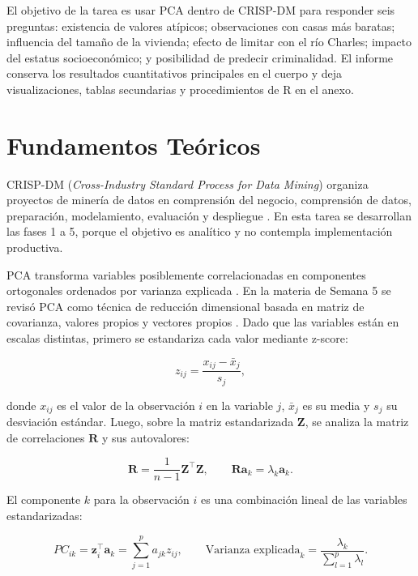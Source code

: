 \documentclass[10pt,a4paper]{article}
\begin{document}
El objetivo de la tarea es usar PCA dentro de CRISP-DM para responder seis preguntas: existencia de valores atípicos; observaciones con casas más baratas; influencia del tamaño de la vivienda; efecto de limitar con el río Charles; impacto del estatus socioeconómico; y posibilidad de predecir criminalidad. El informe conserva los resultados cuantitativos principales en el cuerpo y deja visualizaciones, tablas secundarias y procedimientos de R en el anexo.

\section{Fundamentos Teóricos}

CRISP-DM (\textit{Cross-Industry Standard Process for Data Mining}) organiza proyectos de minería de datos en comprensión del negocio, comprensión de datos, preparación, modelamiento, evaluación y despliegue \citep{chapman2000,levano2026crispdm}. En esta tarea se desarrollan las fases 1 a 5, porque el objetivo es analítico y no contempla implementación productiva.

PCA transforma variables posiblemente correlacionadas en componentes ortogonales ordenados por varianza explicada \citep{jolliffe2002,levano2026pca2}. En la materia de Semana 5 se revisó PCA como técnica de reducción dimensional basada en matriz de covarianza, valores propios y vectores propios \citep{levano2026pca1,levano2026pca2}. Dado que las variables están en escalas distintas, primero se estandariza cada valor mediante z-score:

\begin{equation}
  z_{ij} = \frac{x_{ij} - \bar{x}_j}{s_j},
\end{equation}

donde $x_{ij}$ es el valor de la observación $i$ en la variable $j$, $\bar{x}_j$ es su media y $s_j$ su desviación estándar. Luego, sobre la matriz estandarizada $\mathbf{Z}$, se analiza la matriz de correlaciones $\mathbf{R}$ y sus autovalores:

\begin{equation}
  \mathbf{R}=\frac{1}{n-1}\mathbf{Z}^{\top}\mathbf{Z}, \qquad
  \mathbf{R}\mathbf{a}_k = \lambda_k\mathbf{a}_k.
\end{equation}

El componente $k$ para la observación $i$ es una combinación lineal de las variables estandarizadas:

\begin{equation}
  PC_{ik}=\mathbf{z}_i^{\top}\mathbf{a}_k=\sum_{j=1}^{p} a_{jk}z_{ij}, \qquad
  \text{Varianza explicada}_k=\frac{\lambda_k}{\sum_{l=1}^{p}\lambda_l}.
\end{equation}
\end{document}
